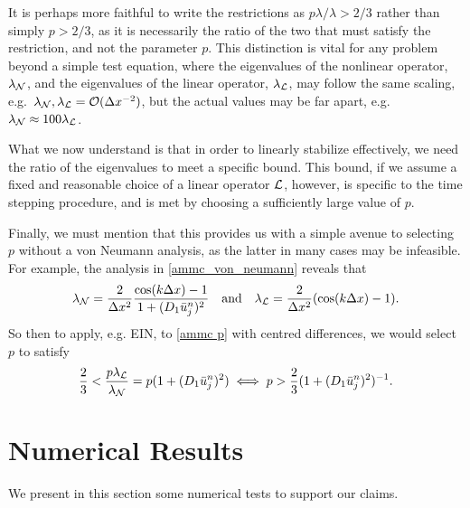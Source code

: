 \begin{remark}
	It is perhaps more faithful to write the restrictions as $p\lambda / \lambda > 2/3$ rather than simply $p > 2/3$, as it is necessarily the ratio of the two that must satisfy the restriction, and not the parameter $p$. This distinction is vital for any problem beyond a simple test equation, where the eigenvalues of the nonlinear operator, $\lambda_{\mathcal{N}}$, and the eigenvalues of the linear operator, $\lambda_{\mathcal{L}}$, may follow the same scaling, e.g.\ $\lambda_{\mathcal{N}}, \lambda_{\mathcal{L}} = \mathcal{O}(\Delta x^{-2})$, but the actual values may be far apart, e.g.\ $\lambda_{\mathcal{N}} \approx 100 \lambda_{\mathcal{L}}$.
\end{remark}
\begin{remark}
	What we now understand is that in order to linearly stabilize effectively, we need the ratio of the eigenvalues to meet a specific bound. This bound, if we assume a fixed and reasonable choice of a linear operator $\mathcal{L}$, however, is specific to the time stepping procedure, and is met by choosing a sufficiently large value of $p$.  
\end{remark}
\begin{remark}
	Finally, we must mention that this provides us with a simple avenue to selecting $p$ without a von Neumann analysis, as the latter in many cases may be infeasible. For example, the analysis in \eqref{ammc_von_neumann} reveals that 
\begin{align}
        \lambda_{\mathcal{N}} = \frac{2}{\Delta x^2}\frac{\cos(k\Delta x)-1}{1 + (D_1\bar u_j^n)^2}
\quad\text{and}\quad 
\lambda_{\mathcal{L}} = \frac{2}{\Delta x^2}(\cos(k\Delta x) - 1).
\label{ammc eig}
\end{align}
So then to apply, e.g. EIN, to \eqref{ammc p} with centred differences, we would select $p$ to satisfy 
\begin{align}
        \frac{2}{3} < \frac{p\lambda_{\mathcal{L}}}{\lambda_{\mathcal{N}}} = p(1 + (D_1 \bar u_j^n)^2) 
\iff 
p > \frac{2}{3}(1 + (D_1 \bar u^n_j)^2)^{-1}.
\label{ammc ein p}
\end{align}
 

\end{remark}

\section{Numerical Results}
We present in this section some numerical tests to support our claims.

